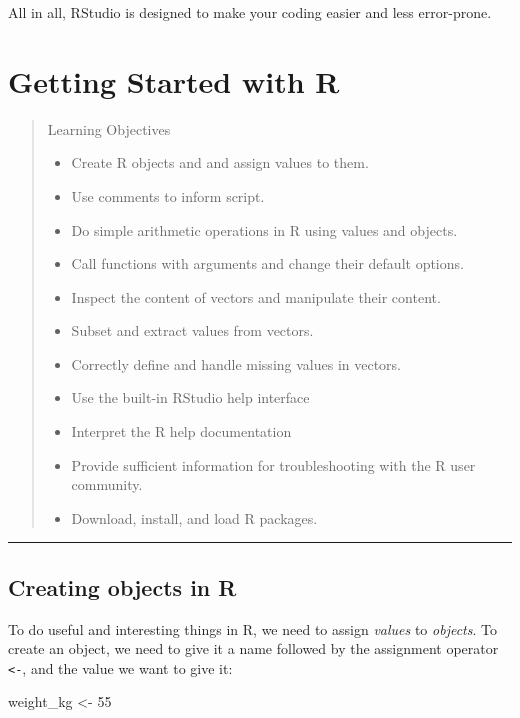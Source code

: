 \documentclass[
]{book}
\newenvironment{Shaded}{\begin{snugshade}}{\end{snugshade}}
\newcommand{\DecValTok}[1]{\textcolor[rgb]{0.00,0.00,0.81}{#1}}
\newcommand{\NormalTok}[1]{#1}
\newcommand{\StringTok}[1]{\textcolor[rgb]{0.31,0.60,0.02}{#1}}
\providecommand{\tightlist}{%
  \setlength{\itemsep}{0pt}\setlength{\parskip}{0pt}}
\begin{document}
All in all, RStudio is designed to make your coding easier and less error-prone.

\hypertarget{gettingstarted}{%
\chapter{Getting Started with R}\label{gettingstarted}}

\begin{quote}
Learning Objectives

\begin{itemize}
\tightlist
\item
  Create R objects and and assign values to them.
\item
  Use comments to inform script.
\item
  Do simple arithmetic operations in R using values and objects.
\item
  Call functions with arguments and change their default options.
\item
  Inspect the content of vectors and manipulate their content.
\item
  Subset and extract values from vectors.
\item
  Correctly define and handle missing values in vectors.
\item
  Use the built-in RStudio help interface
\item
  Interpret the R help documentation
\item
  Provide sufficient information for troubleshooting with the R user community.
\item
  Download, install, and load R packages.
\end{itemize}
\end{quote}

\begin{center}\rule{0.5\linewidth}{0.5pt}\end{center}

\hypertarget{creating-objects-in-r}{%
\section{Creating objects in R}\label{creating-objects-in-r}}

To do useful and interesting things in R, we need to assign \emph{values} to
\emph{objects}. To create an object, we need to give it a name followed by the
assignment operator \texttt{\textless{}-}, and the value we want to give it:

\begin{Shaded}
\begin{Highlighting}[]
\NormalTok{weight_kg <-}\StringTok{ }\DecValTok{55}
\end{Highlighting}
\end{Shaded}
\end{document}
